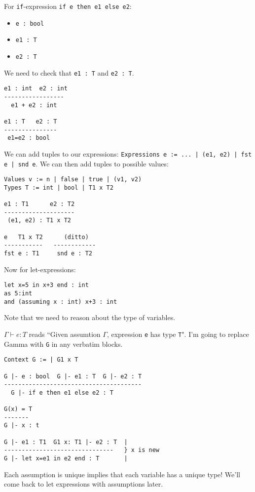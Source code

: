 \documentclass[11pt]{article}
\begin{document}
For \verb~if~-expression \verb~if e then e1 else e2~:
\begin{itemize} 
    \item \verb~e : bool~
    \item \verb~e1 : T~
    \item \verb~e2 : T~
\end{itemize}
We need to check that \verb~e1 : T~ and \verb~e2 : T~.

\begin{verbatim}
e1 : int  e2 : int
-----------------
  e1 + e2 : int

e1 : T   e2 : T
---------------
 e1=e2 : bool
\end{verbatim}

We can add tuples to our expressions: \verb~Expressions e := ... | (e1, e2) | fst e | snd e~. We can then add tuples to possible values:
\begin{verbatim}
Values v := n | false | true | (v1, v2)
Types T := int | bool | T1 x T2

e1 : T1      e2 : T2
--------------------
 (e1, e2) : T1 x T2

e   T1 x T2      (ditto)
-----------   ------------
fst e : T1     snd e : T2
\end{verbatim}

Now for let-expressions:
\begin{verbatim}
let x=5 in x+3 end : int
as 5:int
and (assuming x : int) x+3 : int
\end{verbatim}

Note that we need to reason about the type of variables.

$\Gamma \vdash e : T$ reads ``Given assumtion $\Gamma$, expression \verb~e~ has type \verb~T~". I'm going to replace Gamma with \verb~G~ in any verbatim blocks.

\begin{verbatim}
Context G := | G1 x T

G |- e : bool  G |- e1 : T  G |- e2 : T
---------------------------------------
  G |- if e then e1 else e2 : T

G(x) = T
-------
G |- x : t

G |- e1 : T1  G1 x: T1 |- e2 : T  |
-------------------------------   } x is new
G |- let x=e1 in e2 end : T       |
\end{verbatim}

Each assumption is unique implies that each variable has a unique type! We'll come back to let expressions with assumptions later.
\end{document}
